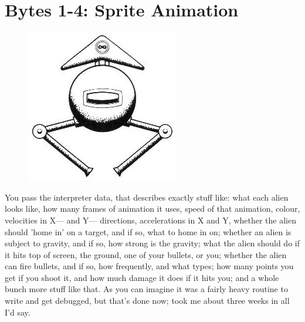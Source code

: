 \section{Bytes 1-4: Sprite Animation}
\begin{definition}
\setlength{\intextsep}{0pt}%
\setlength{\columnsep}{3pt}%
\begin{figure}
\includegraphics[width=\linewidth]{src/callout/ia.jpg} 
\end{figure}
\small
You pass the interpreter data, that describes exactly stuff like: what each
alien looks like, how many frames of animation it uses, speed of that
animation, colour, velocities in X— and Y— directions, accelerations in X and
Y, whether the alien should 'home in' on a target, and if so, what to home in
on; whether an alien is subject to gravity, and if so, how strong is the
gravity; what the alien should do if it hits top of screen, the ground, one of
your bullets, or you; whether the alien can fire bullets, and if so, how
frequently, and what types; how many points you get if you shoot it, and how
much damage it does if it hits you; and a whole bunch more stuff like that. As
you can imagine it was a fairly heavy routine to write and get debugged, but
that's done now; took me about three weeks in all I'd say.
\end{definition}


